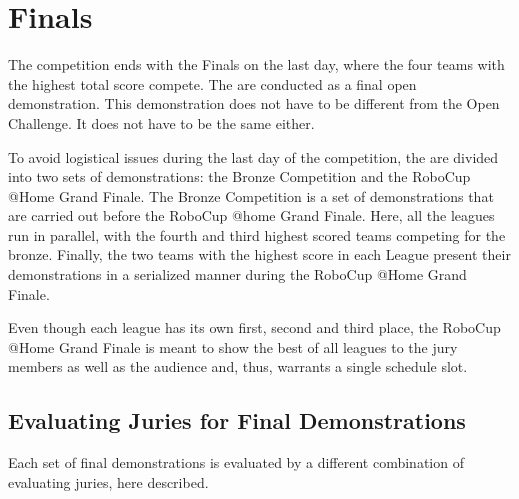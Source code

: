 \chapter{Finals}

The competition ends with the Finals on the last day, where the four teams with the highest total score compete.
The  are conducted as a final open demonstration.
This demonstration does not have to be different from the Open Challenge. 
It does not have to be the same either.

To avoid logistical issues during the last day of the competition, the  are divided into two sets of demonstrations: the Bronze Competition and the RoboCup @Home Grand Finale.
The Bronze Competition is a set of demonstrations that are carried out before the RoboCup @home Grand Finale. Here, all the leagues run in parallel, with the fourth and third highest scored teams competing for the bronze.
Finally, the two teams with the highest score in each League present their demonstrations in a serialized manner during the RoboCup @Home Grand Finale.

Even though each league has its own first, second and third place, the RoboCup @Home Grand Finale is meant to show the best of all leagues to the jury members as well as the audience and, thus, warrants a single schedule slot.

\section{Evaluating Juries for Final Demonstrations}
Each set of final demonstrations is evaluated by a different combination of evaluating juries, here described.


